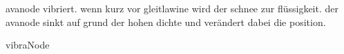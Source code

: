 avanode vibriert. wenn kurz vor gleitlawine wird der schnee zur flüssigkeit. der avanode sinkt auf grund der hohen dichte und verändert dabei die position.

vibraNode
